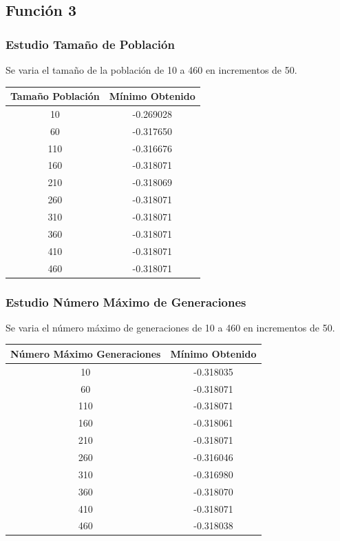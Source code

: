 \documentclass[12pt]{article}
\begin{document}
\subsection{Función 3}
\subsubsection*{Estudio Tamaño de Población}
	Se varia el tamaño de la población de 10 a 460 en incrementos de 50.
\begin{table}[H]
\begin{center}
\begin{tabular}{|cc|} \hline
Tamaño Población & Mínimo Obtenido \\  \hline
10  & -0.269028 \\ 
60  & -0.317650 \\ 
110 & -0.316676 \\
160 & -0.318071 \\
210 & -0.318069 \\
260 & -0.318071 \\
310 & -0.318071 \\
360 & -0.318071 \\ 
410 & -0.318071 \\
460 & -0.318071 \\  \hline
\end{tabular}
\end{center}
\end{table}
 

\subsubsection*{Estudio Número Máximo de Generaciones}
	Se varia el número máximo de generaciones de 10 a 460 en incrementos de 50.
\begin{table}[H]
\begin{center}
\begin{tabular}{|cc|} \hline
Número Máximo Generaciones & Mínimo Obtenido \\  \hline
10  & -0.318035 \\ 
60  & -0.318071 \\ 
110 & -0.318071 \\
160 & -0.318061 \\
210 & -0.318071 \\
260 & -0.316046 \\
310 & -0.316980 \\
360 & -0.318070 \\ 
410 & -0.318071 \\
460 & -0.318038 \\  \hline
\end{tabular}
\end{center}
\end{table}
\end{document}

